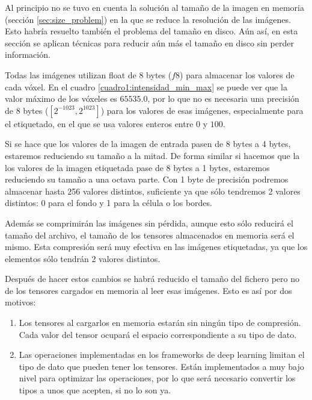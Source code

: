 Al principio no se tuvo en cuenta la solución al tamaño de la imagen en memoria (sección \ref{sec:size_problem}) en la que se reduce la resolución de las imágenes. Esto habría resuelto también el problema del tamaño en disco. Aún así, en esta sección se aplican técnicas para reducir aún más el tamaño en disco sin perder información.

Todas las imágenes utilizan float de 8 bytes ($f8$) para almacenar los valores de cada vóxel. En el cuadro \ref{cuadro1:intensidad_min_max} se puede ver que la valor máximo de los vóxeles es $65535.0$, por lo que no es necesaria una precisión de 8 bytes ($[2^{-1023}, 2^{1023}]$) para los valores de esas imágenes, especialmente para el etiquetado, en el que se usa valores enteros entre $0$ y $100$.


Si se hace que los valores de la imagen de entrada pasen de 8 bytes a 4 bytes, estaremos reduciendo su tamaño a la mitad. De forma similar si hacemos que la los valores de la imagen etiquetada pase de 8 bytes a 1 bytes, estaremos reduciendo su tamaño a una octava parte. Con 1 byte de precisión podremos almacenar hasta 256 valores distintos, suficiente ya que sólo tendremos 2 valores distintos: 0 para el fondo y 1 para la célula o los bordes. 

Además se comprimirán las imágenes sin pérdida, aunque esto sólo reducirá el tamaño del archivo, el tamaño de los tensores almacenados en memoria será el mismo. Esta compresión será muy efectiva en las imágenes etiquetadas, ya que los elementos sólo tendrán 2 valores distintos. 

Después de hacer estos cambios se habrá reducido el tamaño del fichero pero no de los tensores cargados en memoria al leer esas imágenes. Esto es así por dos motivos:
\begin{enumerate}
\item Los tensores al cargarlos en memoria estarán sin ningún tipo de compresión. Cada valor del tensor ocupará el espacio correspondiente a su tipo de dato.
\item Las operaciones implementadas en los frameworks de deep learning limitan el tipo de dato que pueden tener los tensores. Están implementados a muy bajo nivel para optimizar las operaciones, por lo que será necesario  convertir los tipos a unos que acepten, si no lo son ya.
\end{enumerate}

